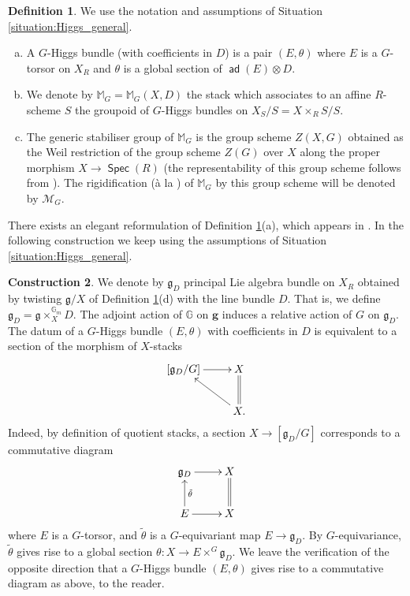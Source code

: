 \documentclass{article}
\newcommand{\Gb}{\mathbb{G}}
\DeclareMathOperator{\G}{\mathbb{G}}
\newcommand{\Mc}{\mathcal{M}}
\DeclareMathOperator{\Spec}{\mathsf{Spec}}
\DeclareMathOperator{\ad}{\mathsf{ad}}
\theoremstyle{definition}
\newtheorem{definition}{Definition}[section]
\newtheorem{construction}[definition]{Construction}
\theoremstyle{plain}
\begin{document}
\begin{definition}\label{defi:higgs}
We use the notation and assumptions of Situation \ref{situation:Higgs_general}.
\begin{enumerate}[(a)]
\item  A $G$-Higgs bundle (with coefficients in $D$) is a pair $(E,\theta)$ where $E$ is a $G$-torsor on $X_R$ and $\theta$ is a global section of $\ad(E) \otimes D$.
\item We denote by $\mathbb{M}_G = \mathbb{M}_G(X,D)$ the stack which associates to an affine $R$-scheme $S$ the groupoid of $G$-Higgs bundles on $X_S/S = X \times_R S/S$.
\item The generic stabiliser group of $\mathbb{M}_G$ is the group scheme $Z(X,G)$ obtained as the Weil restriction of the group scheme $Z(G)$ over $X$ along the proper morphism $X \to \Spec(R)$ (the representability of this group scheme follows from \cite[Theorem 1.5]{MR2239345}). The rigidification (\`a la \cite[Theorem 5.1.5]{abramovich2003twisted}) of $\mathbb{M}_G$ by this group scheme will be denoted by $\Mc_G$. 
\end{enumerate}
\end{definition}

There exists an elegant reformulation of Definition \ref{defi:higgs}(a), which appears in \cite[4.2.2]{MR2653248}. In the following construction we keep using the assumptions of Situation \ref{situation:Higgs_general}.

\begin{construction}\label{construction:ngo_higgs}
We denote by $\mathfrak{g}_D$ principal Lie algebra bundle on $X_R$ obtained by twisting $\mathfrak{g}/X$ of Definition \ref{defi:higgs}(d) with the line bundle $D$. That is, we define $\mathfrak{g}_D = \mathfrak{g} \times_X^{\G_m} D$. The adjoint action of $\Gb$ on $\mathbf{g}$ induces a relative action of $G$ on $\mathfrak{g}_D$. The datum of a $G$-Higgs bundle $(E,\theta)$ with coefficients in $D$ is equivalent to a section of the morphism of $X$-stacks
\[
\xymatrix{
[\mathfrak{g}_D/G] \ar[r] & X \ar@{=}[d] \\
& X. \ar[lu]
}
\] 
Indeed, by definition of quotient stacks, a section $X \to [\mathfrak{g}_D/G]$ corresponds to a commutative diagram
\[
\xymatrix{
\mathfrak{g}_D \ar[r] & X \ar@{=}[d] \\
E \ar[r] \ar[u]_{\tilde{\theta}} & X 
}
\]
where $E$ is a $G$-torsor, and $\tilde{\theta}$ is a $G$-equivariant map $E \to \mathfrak{g}_D$. By $G$-equivariance, $\tilde{\theta}$ gives rise to a global section $\theta\colon X \to E\times^G \mathfrak{g}_D$. We leave the verification of the opposite direction that a $G$-Higgs bundle $(E,\theta)$ gives rise to a commutative diagram as above, to the reader.
\end{construction}
\end{document}
